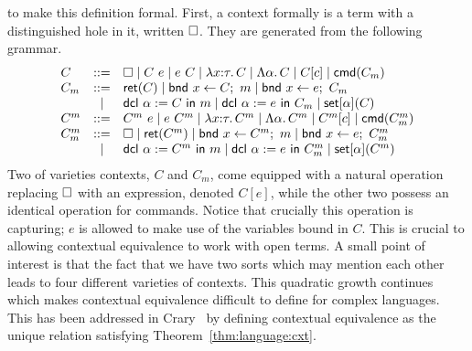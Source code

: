 to make this definition formal. First, a context formally is a term
with a distinguished hole in it, written $\square$. They are generated
from the following grammar.
\[
  \begin{array}{lcl}
    C &::=& \square \mid C\ e \mid e\ C \mid \lambda x {:} \tau.\, C \mid
            \Lambda \alpha.\, C \mid C[c] \mid \mathsf{cmd}(C_m)\\
    C_m &::=& \mathsf{ret}(C) \mid \mathsf{bnd}\ x \gets C;\ m \mid \mathsf{bnd}\ x \gets e;\ C_m\\
      & \mid & \mathsf{dcl}\ \alpha := C\ \mathsf{in}\ m \mid \mathsf{dcl}\ \alpha := e\ \mathsf{in}\ C_m \mid \mathsf{set}[\alpha](C)\\
    C^m &::=& C^m\ e \mid e\ C^m \mid \lambda x {:} \tau.\, C^m \mid
    \Lambda \alpha.\, C^m \mid C^m[c] \mid \mathsf{cmd}(C_m^m)\\
    C_m^m &::=& \square \mid \mathsf{ret}(C^m) \mid \mathsf{bnd}\ x \gets C^m;\ m \mid \mathsf{bnd}\ x \gets e;\ C_m^m\\
 & \mid & \mathsf{dcl}\ \alpha := C^m\ \mathsf{in}\ m \mid \mathsf{dcl}\ \alpha := e\ \mathsf{in}\ C_m^m \mid \mathsf{set}[\alpha](C^m)\\
  \end{array}
\]
Two of varieties contexts, $C$ and $C_m$, come equipped with a natural
operation replacing $\square$ with an expression, denoted $C[e]$, while
the other two possess an identical operation for commands. Notice that
crucially this operation is capturing; $e$ is allowed to make use of
the variables bound in $C$. This is crucial to allowing contextual
equivalence to work with open terms. A small point of interest is that
the fact that we have two sorts which may mention each other leads to
four different varieties of contexts. This quadratic growth continues
which makes contextual equivalence difficult to define for complex
languages. This has been addressed in Crary~\citep{TODO-MODULES} by
defining contextual equivalence as the unique relation satisfying
Theorem~\ref{thm:language:cxt}.

